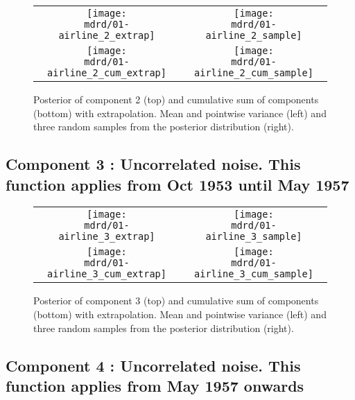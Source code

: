 \documentclass{article} %
\begin{document}


\begin{figure}[H]
\newcommand{\wmgd}{0.5\columnwidth}
\newcommand{\hmgd}{3.0cm}
\newcommand{\mdrd}{01-airline}
\newcommand{\mbm}{\hspace{-0.3cm}}
\begin{tabular}{cc}
\mbm \texttt{[image: \\mdrd/01-airline\_2\_extrap]} & \texttt{[image: \\mdrd/01-airline\_2\_sample]} \\
\mbm \texttt{[image: \\mdrd/01-airline\_2\_cum\_extrap]} & \texttt{[image: \\mdrd/01-airline\_2\_cum\_sample]}
\end{tabular}
\caption{Posterior of component 2 (top) and cumulative sum of components (bottom) with extrapolation. Mean and pointwise variance (left) and three random samples from the posterior distribution (right).}
\label{fig:extrap2}
\end{figure}

\subsection{Component 3 : Uncorrelated noise. This function applies from Oct 1953 until May 1957}



\begin{figure}[H]
\newcommand{\wmgd}{0.5\columnwidth}
\newcommand{\hmgd}{3.0cm}
\newcommand{\mdrd}{01-airline}
\newcommand{\mbm}{\hspace{-0.3cm}}
\begin{tabular}{cc}
\mbm \texttt{[image: \\mdrd/01-airline\_3\_extrap]} & \texttt{[image: \\mdrd/01-airline\_3\_sample]} \\
\mbm \texttt{[image: \\mdrd/01-airline\_3\_cum\_extrap]} & \texttt{[image: \\mdrd/01-airline\_3\_cum\_sample]}
\end{tabular}
\caption{Posterior of component 3 (top) and cumulative sum of components (bottom) with extrapolation. Mean and pointwise variance (left) and three random samples from the posterior distribution (right).}
\label{fig:extrap3}
\end{figure}

\subsection{Component 4 : Uncorrelated noise. This function applies from May 1957 onwards}
\end{document}

